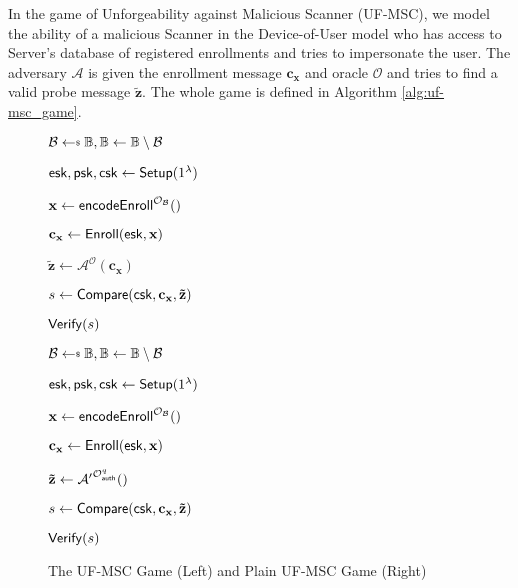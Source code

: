 In the game of Unforgeability against Malicious Scanner (UF-MSC), we model the ability of a malicious {\sf Scanner} in the Device-of-User model who has access to {\sf Server}'s database of registered enrollments and tries to impersonate the user. The adversary $\mathcal{A}$ is given the enrollment message $\mathbf{c_x}$ and oracle $\mathcal{O}$ and tries to find a valid probe message $\mathbf{\tilde{z}}$. The whole game is defined in Algorithm \ref{alg:uf-msc_game}.


\begin{figure}[h]
\centering

	\begin{minipage}[t]{0.45\linewidth}
	\begin{algorithm}[H]
	\caption{${\sf UF-MSC}_{\Pi, \mathbb{B}}(\mathcal{A})$}
	\label{alg:uf-msc_game}
	\begin{algorithmic}[1]
		\State $\mathcal{B} \getsdollar \mathbb{B}, \mathbb{B} \gets \mathbb{B} \setminus \mathcal{B}$

		\State ${\sf esk}, {\sf psk}, {\sf csk} \gets {\sf Setup}(1^\lambda)$

		\State $\mathbf{x} \gets {\sf encodeEnroll}^{\mathcal{O}_{\mathcal{B}}}()$

		\State $\mathbf{c_x} \gets {\sf Enroll}({\sf esk}, \mathbf{x})$

		\State ${\mathbf{\tilde{z}}} \gets \mathcal{A}^{ \mathcal{O} } ( \mathbf{c_x} )$

		\State $s \gets {\sf Compare}( {\sf csk}, \mathbf{c_x}, \mathbf{\tilde{z}} )$

		\State \Return ${\sf Verify}(s)$
	\end{algorithmic}
	\end{algorithm}
	\end{minipage}
	\begin{minipage}[t]{0.45\linewidth}
	\begin{algorithm}[H]
	\caption{${\sf UF-MSC^\prime}_{\Pi, \mathbb{B}}(\mathcal{A^\prime})$}
	\label{alg:plain_uf-msc_game}
	\begin{algorithmic}[1]
		\State $\mathcal{B} \getsdollar \mathbb{B}, \mathbb{B} \gets \mathbb{B} \setminus \mathcal{B}$

		\State ${\sf esk}, {\sf psk}, {\sf csk} \gets {\sf Setup}(1^\lambda)$

		\State $\mathbf{x} \gets {\sf encodeEnroll}^{\mathcal{O}_{\mathcal{B}}}()$

		\State $\mathbf{c_x} \gets {\sf Enroll}({\sf esk}, \mathbf{x})$

		\State ${\mathbf{\tilde{z}}} \gets \mathcal{A'}^{\mathcal{O}_{\sf auth}^{q}}()$

		\State $s \gets {\sf Compare}( {\sf csk}, \mathbf{c_x}, \mathbf{\tilde{z}} )$

		\State \Return ${\sf Verify}(s)$
	\end{algorithmic}
	\end{algorithm}
	\end{minipage}

\caption{The UF-MSC Game (Left) and Plain UF-MSC Game (Right)}
\label{fig:uf-msc_game}
\end{figure}

